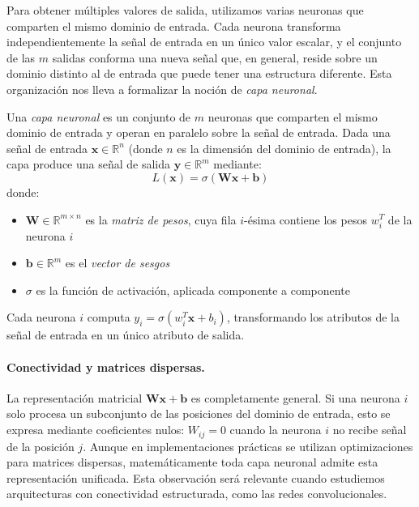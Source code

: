 Para obtener múltiples valores de salida, utilizamos varias neuronas que comparten el mismo dominio de entrada. Cada neurona transforma independientemente la señal de entrada en un único valor escalar, y el conjunto de las $m$ salidas conforma una nueva señal que, en general, reside sobre un dominio distinto al de entrada que puede tener una estructura diferente. Esta organización nos lleva a formalizar la noción de \textit{capa neuronal}.

\begin{definition}
\label{def:capa_neuronal}
Una \textit{capa neuronal} es un conjunto de $m$ neuronas que comparten el mismo dominio de entrada y operan en paralelo sobre la señal de entrada. Dada una señal de entrada $\mathbf{x} \in \mathbb{R}^n$ (donde $n$ es la dimensión del dominio de entrada), la capa produce una señal de salida $\mathbf{y} \in \mathbb{R}^m$ mediante:
\[
L(\mathbf{x}) = \sigma(\mathbf{W}\mathbf{x} + \mathbf{b})
\]
donde:
\begin{itemize}
    \item $\mathbf{W} \in \mathbb{R}^{m \times n}$ es la \textit{matriz de pesos}, cuya fila $i$-ésima contiene los pesos $w_i^T$ de la neurona $i$
    \item $\mathbf{b} \in \mathbb{R}^m$ es el \textit{vector de sesgos}
    \item $\sigma$ es la función de activación, aplicada componente a componente
\end{itemize}
Cada neurona $i$ computa $y_i = \sigma(w_i^T \mathbf{x} + b_i)$, transformando los atributos de la señal de entrada en un único atributo de salida.
\end{definition}

\paragraph{Conectividad y matrices dispersas.}

 La representación matricial $\mathbf{W}\mathbf{x} + \mathbf{b}$ es completamente general. Si una neurona $i$ solo procesa un subconjunto de las posiciones del dominio de entrada, esto se expresa mediante coeficientes nulos: $W_{ij} = 0$ cuando la neurona $i$ no recibe señal de la posición $j$. Aunque en implementaciones prácticas se utilizan optimizaciones para matrices dispersas, matemáticamente toda capa neuronal admite esta representación unificada. Esta observación será relevante cuando estudiemos arquitecturas con conectividad estructurada, como las redes convolucionales.

